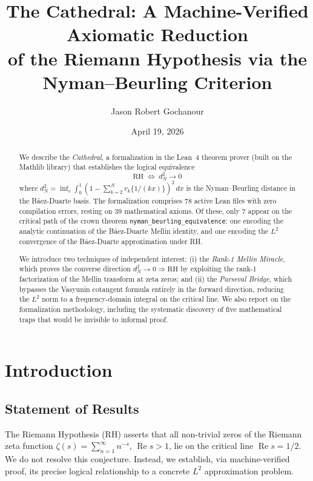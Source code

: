 \documentclass[11pt,a4paper]{article}
\title{%
  The Cathedral: A Machine-Verified Axiomatic Reduction\\
  of the Riemann Hypothesis via the Nyman--Beurling Criterion%
}
\author{
  Jason Robert Gochanour
}
\date{April 19, 2026}
\theoremstyle{plain}
\theoremstyle{definition}
\theoremstyle{remark}
\newcommand{\RH}{\mathrm{RH}}
\newcommand{\re}{\operatorname{Re}}
\newcommand{\fract}[1]{\{#1\}}
\newcommand{\lean}[1]{\texttt{#1}}
\begin{document}
\maketitle

\begin{abstract}
We describe the \emph{Cathedral}, a formalization in the Lean~4 theorem
prover (built on the Mathlib library) that establishes the logical
equivalence
\[
  \RH \;\iff\; d_N^2 \to 0
\]
where $d_N^2 = \inf_{v} \int_0^1 (1 - \sum_{k=2}^N v_k \fract{1/(kx)})^2\,dx$
is the Nyman--Beurling distance in the B\'aez-Duarte basis. The
formalization comprises 78 active Lean files with zero compilation errors,
resting on 39 mathematical axioms. Of these, only 7 appear on the critical
path of the crown theorem \lean{nyman\_beurling\_equivalence}: one
encoding the analytic continuation of the B\'aez-Duarte Mellin identity,
and one encoding the $L^2$ convergence of the B\'aez-Duarte approximation
under RH.

We introduce two techniques of independent interest: (i) the
\emph{Rank-1 Mellin Miracle}, which proves the converse direction
$d_N^2 \to 0 \Rightarrow \RH$ by exploiting the rank-1 factorization
of the Mellin transform at zeta zeros; and (ii) the \emph{Parseval Bridge},
which bypasses the Vasyunin cotangent formula entirely in the forward
direction, reducing the $L^2$ norm to a frequency-domain integral on the
critical line. We also report on the formalization methodology,
including the systematic discovery of five mathematical traps that
would be invisible to informal proof.
\end{abstract}

\tableofcontents

\section{Introduction}

\subsection{Statement of Results}

The Riemann Hypothesis (RH) asserts that all non-trivial zeros of the
Riemann zeta function $\zeta(s) = \sum_{n=1}^\infty n^{-s}$, $\re s > 1$,
lie on the critical line $\re s = 1/2$. We do not resolve this
conjecture. Instead, we establish, via machine-verified proof, its
precise logical relationship to a concrete $L^2$ approximation problem.
\end{document}
